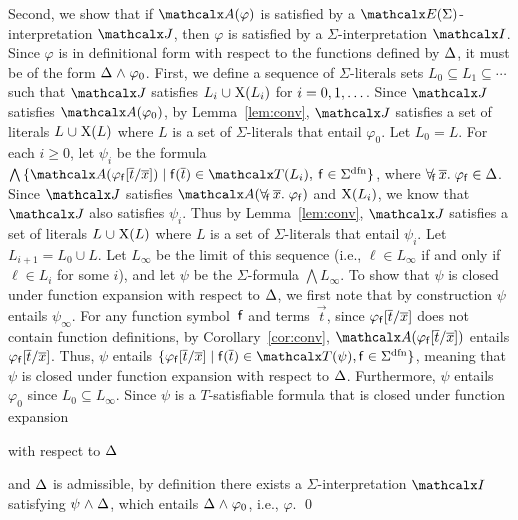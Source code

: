 \begin{proofsketch}
Second, we show that if $\conv( \varphi )$ is satisfied by a
$\extendsig{\Sigma}$-interpretation $\J$, then $\varphi$ is satisfied by a
$\Sigma$-interpretation $\I$. Since $\varphi$ is in definitional form with
respect to the functions defined by $\DDD$, it must be of the form
$\DDD \wedge \varphi_0$.
First, we define a sequence of $\Sigma$-literals sets $L_0 \subseteq L_1 \subseteq \cdots$
such that $\J$ satisfies $L_i \cup \absconstraints( L_i )$ for $i = 0, 1, \ldots\vthinspace$.
Since $\J$ satisfies $\conv( \varphi_0 )$,
by Lemma~\ref{lem:conv},
$\J$ satisfies a set of literals $L \cup \absconstraints( L )$ where $L$ is a set of $\Sigma$-literals that entail $\varphi_0$.
Let $L_0 = L$.
For each $i \geq 0$,
let $\psi_i$ be the formula $\bigwedge\, \{ \conv( \varphi_{\con{f}}[ \vec t / \vec x ] ) \mid \con{f}( \vec t ) \in \terms( L_i ),\: \con{f} \in \sfundefs{\Sigma} \}$,
where $\forallf{\con{f}} \vec x.\; \varphi_{\con{f}} \in \DDD$.
Since $\J$ satisfies $\conv( \forallf{\con{f}} \vec x.\; \varphi_{\con{f}} )$ and $\mathrm{X}( L_i )$,
we know that $\J$ also satisfies $\psi_i$.
Thus by Lemma~\ref{lem:conv},
$\J$ satisfies a set of literals $L \cup \absconstraints( L )$ where $L$ is a set of $\Sigma$-literals that entail $\psi_i$.
Let $L_{i+1} = L_0 \cup L$.
Let $L_\infty$ be the limit of this sequence (i.e., $\ell \in L_\infty$ if and only if
$\ell \in L_i$ for some $i$),
and let $\psi$ be the $\Sigma$-formula $\bigwedge L_\infty$.
To show that $\psi$ is closed under function expansion with respect to $\DDD$,
we first note that by construction $\psi$ entails $\psi_\infty$.
For any function symbol~$\mathsf{f}$ and terms~$\vec t$, since $\varphi_{\mathsf{f}}[ \overline{t} / \overline{x} ]$ does not contain function definitions,
by Corollary~\ref{cor:conv},
$\conv( \varphi_{\con{f}}[ \vec t / \vec x ] )$ entails $\varphi_{\mathsf{f}}[ \overline{t} / \overline{x} ]$.
Thus, $\psi$ entails $\{ \varphi_{\con{f}}[ \vec t / \vec x ] \mid \con{f}( \vec t ) \in \terms( \psi ), \con{f} \in \sfundefs{\Sigma} \}$,
meaning that $\psi$ is closed under function expansion with respect to $\DDD$.
Furthermore, $\psi$ entails $\varphi_0$ since $L_0 \subseteq L_\infty$.
Since $\psi$ is a $T$-satisfiable formula that is closed under function expansion\begin{rep} with respect to $\DDD$\end{rep} and $\DDD$ is admissible,
by definition there exists a $\Sigma$-interpretation $\I$ satisfying $\psi \wedge \DDD$, which entails $\DDD \wedge \varphi_0$,
i.e., $\varphi$.
\qed
\end{proofsketch}

